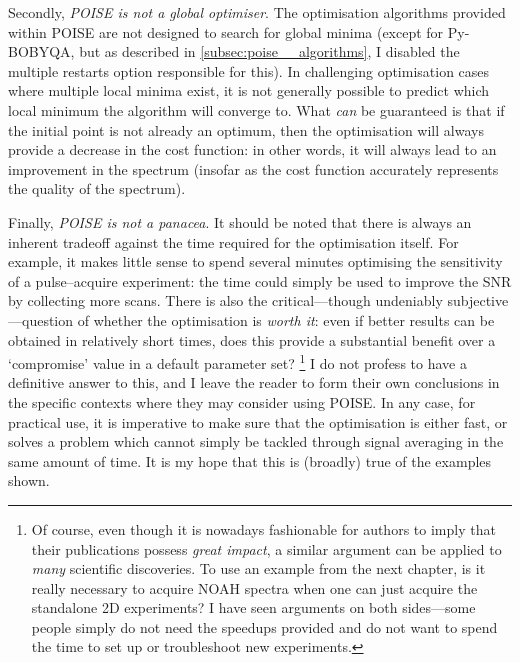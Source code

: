 Secondly, \textit{POISE is not a global optimiser}.
The optimisation algorithms provided within POISE are not designed to search for global minima (except for Py-BOBYQA, but as described in \cref{subsec:poise__algorithms}, I disabled the multiple restarts option responsible for this).
In challenging optimisation cases where multiple local minima exist, it is not generally possible to predict which local minimum the algorithm will converge to.
What \textit{can} be guaranteed is that if the initial point is not already an optimum, then the optimisation will always provide a decrease in the cost function: in other words, it will always lead to an improvement in the spectrum (insofar as the cost function accurately represents the quality of the spectrum).

Finally, \textit{POISE is not a panacea}.
It should be noted that there is always an inherent tradeoff against the time required for the optimisation itself.
For example, it makes little sense to spend several minutes optimising the sensitivity of a pulse--acquire experiment: the time could simply be used to improve the SNR by collecting more scans.
There is also the critical---though undeniably subjective---question of whether the optimisation is \textit{worth it}: even if better results can be obtained in relatively short times, does this provide a substantial benefit over a `compromise' value in a default parameter set?%
\footnote{Of course, even though it is nowadays fashionable for authors to imply that their publications possess \textit{great impact}, a similar argument can be applied to \textit{many} scientific discoveries. To use an example from the next chapter, is it really necessary to acquire NOAH spectra when one can just acquire the standalone 2D experiments? I have seen arguments on both sides---some people simply do not need the speedups provided and do not want to spend the time to set up or troubleshoot new experiments.}
I do not profess to have a definitive answer to this, and I leave the reader to form their own conclusions in the specific contexts where they may consider using POISE.
In any case, for practical use, it is imperative to make sure that the optimisation is either fast, or solves a problem which cannot simply be tackled through signal averaging in the same amount of time.
It is my hope that this is (broadly) true of the examples shown.
